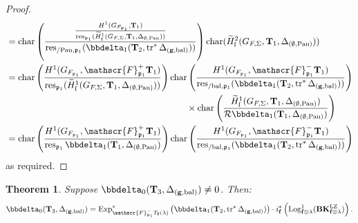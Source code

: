\documentclass[10pt]{amsart}
\numberwithin{equation}{section}
\newtheorem{thm}{Theorem}[section]
\theoremstyle{definition}
\theoremstyle{remark} %
\DeclareMathOperator{\Char}{char}
\newcommand{\Exp}{\operatorname{Exp}}
\newcommand{\Log}{\operatorname{Log}}
\newcommand{\pan}{\mathrm{Pan}}
\DeclareMathOperator{\res}{res}
\renewcommand{\b}{\mathrm{bal}}
\newcommand{\f}{\mathbf{f}}
\newcommand{\scrF}{\mathscr{F}}
\newcommand{\g}{\mathbf{g}}
\newcommand{\p}{\mathfrak{p}}
\newcommand{\R}{\mathcal{R}}
\newcommand{\T}{\mathbf{T}}
\begin{document}
\begin{proof}
\begin{align}
\begin{aligned}
					&= \Char \left(\dfrac{\frac{H^1(G_{F_{\p_1}},\T_{1})}{\res_{\p_1}(\widetilde{H}^1_{\mathrm{f}}(G_{F,\Sigma},\T_{1}, \Delta_{{\emptyset, \pan}})) }}{\res_{/\pan, \p_1}(\bbdelta_1(\T_2, \operatorname{tr}^*\Delta_{(\g,\b)}))} \right) \Char(\widetilde{H}^2_{\mathrm{f}}(G_{F,\Sigma}, \T_1, \Delta_{(\emptyset,\pan)})) \\
					&= \Char\left(  \frac{H^1(G_{F_{\p_1}},\scrF^+_{\p_1} \T_{1})}{\res_{\p_1}(\widetilde{H}^1_{\mathrm{f}}(G_{F,\Sigma},\T_{1}, \Delta_{(\emptyset,\pan)})) }\right) \Char\left( \frac{H^1(G_{F_{\p_1}},\scrF^-_{\p_1} \T_{1})}{ \res_{/\b, \p_1}(\bbdelta_1(\T_2, \operatorname{tr}^*\Delta_{(\g,\b)}))} \right) \\
					&\qquad \qquad \qquad \qquad \qquad \qquad \qquad \qquad \qquad \qquad \times \Char\left( \dfrac{\widetilde{H}^1_{\mathrm{f}}(G_{F,\Sigma}, \T_1, \Delta_{(\emptyset,\pan)})}{\R\bbdelta_1(\T_{1},\Delta_{(\emptyset,\pan)})} \right) \\
					&=\Char\left(  \frac{H^1(G_{F_{\p_1}},\scrF^+_{\p_1} \T_{1})}{\res_{\p_1}\bbdelta_1(\T_{1},\Delta_{(\emptyset,\pan)}) }\right) \Char\left( \frac{H^1(G_{F_{\p_1}},\scrF^-_{\p_1} \T_{1})}{ \res_{/\b, \p_1}(\bbdelta_1(\T_2, \operatorname{tr}^*\Delta_{(\g,\b)}))} \right)
				\end{aligned}
			\end{align}	
			as required.
		\end{proof}
		\begin{thm}
			\label{main_theorem_1}
			Suppose $\bbdelta_0(\T_{3}, \Delta_{(\g, \b)}) \ne 0$. Then:
			\begin{align*}
				\bbdelta_0(\T_{3}, \Delta_{(\g, \b)})  =  \Exp^*_{\scrF^-_{\p_1} T_{\f}(\lambda)}\left( \bbdelta_1(\T_2, \operatorname{tr}^*\Delta_{(\g,\b)})\right)\cdot i^*_\f\left(\Log_{\f \otimes \lambda}^1(\mathbf{BK}^{\rm LZ}_{\f\otimes \lambda})\right).
			\end{align*}	
		\end{thm}
\end{document}
